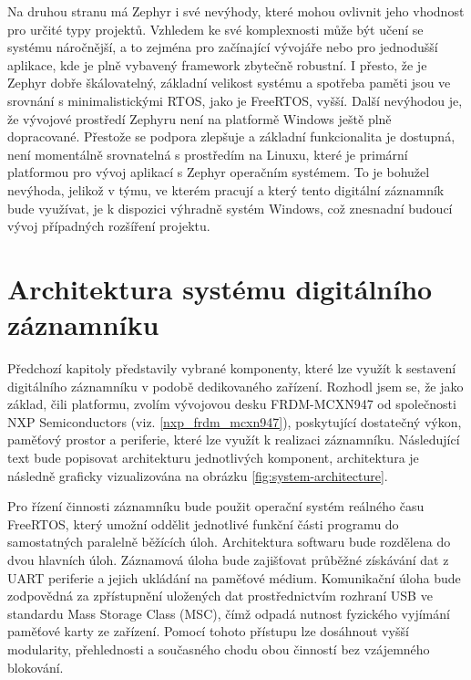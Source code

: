 Na druhou stranu má Zephyr i své nevýhody, které mohou ovlivnit jeho vhodnost pro určité typy projektů. Vzhledem ke své komplexnosti může být učení se systému náročnější, a to zejména pro začínající vývojáře nebo pro jednodušší aplikace, kde je plně vybavený framework zbytečně robustní. I přesto, že je Zephyr dobře škálovatelný, základní velikost systému a spotřeba paměti jsou ve srovnání s minimalistickými RTOS, jako je FreeRTOS, vyšší. Další nevýhodou je, že vývojové prostředí Zephyru není na platformě Windows ještě plně dopracované. Přestože se podpora zlepšuje a základní funkcionalita je dostupná, není momentálně srovnatelná s prostředím na Linuxu, které je primární platformou pro vývoj aplikací s Zephyr operačním systémem. To je bohužel nevýhoda, jelikož v týmu, ve kterém pracují a který tento digitální záznamník bude využívat, je k dispozici výhradně systém Windows, což znesnadní budoucí vývoj případných rozšíření projektu. \cite{nabto_guide_zephyr_vs_freertos}



\section{Architektura systému digitálního záznamníku}
\label{architektura_systemu_digitalniho_zaznamniku}
Předchozí kapitoly představily vybrané komponenty, které lze využít k sestavení digitálního záznamníku v podobě dedikovaného zařízení. Rozhodl jsem se, že jako základ, čili platformu, zvolím vývojovou desku FRDM-MCXN947 od společnosti NXP Semiconductors (viz. \ref{nxp_frdm_mcxn947}), poskytující dostatečný výkon, paměťový prostor a periferie, které lze využít k realizaci záznamníku. Následující text bude popisovat architekturu jednotlivých komponent, architektura je následně graficky vizualizována na obrázku \ref{fig:system-architecture}.

Pro řízení činnosti záznamníku bude použit operační systém reálného času FreeRTOS, který umožní oddělit jednotlivé funkční části programu do samostatných paralelně běžících úloh. Architektura softwaru bude rozdělena do dvou hlavních úloh. Záznamová úloha bude zajišťovat průběžné získávání dat z UART periferie a jejich ukládání na paměťové médium. Komunikační úloha bude zodpovědná za zpřístupnění uložených dat prostřednictvím rozhraní USB ve standardu Mass Storage Class (MSC), čímž odpadá nutnost fyzického vyjímání paměťové karty ze zařízení. Pomocí tohoto přístupu lze dosáhnout vyšší modularity, přehlednosti a současného chodu obou činností bez vzájemného blokování.

